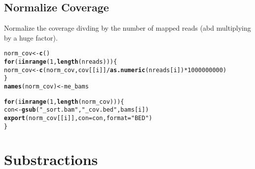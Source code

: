 \documentclass{article}\usepackage[]{graphicx}\usepackage[]{color}
\makeatletter
\newcommand{\hlnum}[1]{\textcolor[rgb]{0.686,0.059,0.569}{#1}}%
\newcommand{\hlstr}[1]{\textcolor[rgb]{0.192,0.494,0.8}{#1}}%
\newcommand{\hlopt}[1]{\textcolor[rgb]{0,0,0}{#1}}%
\newcommand{\hlstd}[1]{\textcolor[rgb]{0.345,0.345,0.345}{#1}}%
\newcommand{\hlkwa}[1]{\textcolor[rgb]{0.161,0.373,0.58}{\textbf{#1}}}%
\newcommand{\hlkwb}[1]{\textcolor[rgb]{0.69,0.353,0.396}{#1}}%
\newcommand{\hlkwc}[1]{\textcolor[rgb]{0.333,0.667,0.333}{#1}}%
\newcommand{\hlkwd}[1]{\textcolor[rgb]{0.737,0.353,0.396}{\textbf{#1}}}%
\newenvironment{kframe}{%
 \def\at@end@of@kframe{}%
 \ifinner\ifhmode%
  \def\at@end@of@kframe{\end{minipage}}%
  \begin{minipage}{\columnwidth}%
 \fi\fi%
 \def\FrameCommand##1{\hskip\@totalleftmargin \hskip-\fboxsep
 \colorbox{shadecolor}{##1}\hskip-\fboxsep
     \hskip-\linewidth \hskip-\@totalleftmargin \hskip\columnwidth}%
 \MakeFramed {\advance\hsize-\width
   \@totalleftmargin\z@ \linewidth\hsize
   \@setminipage}}%
 {\par\unskip\endMakeFramed%
 \at@end@of@kframe}
\newenvironment{knitrout}{}{} %
\makeatother
\begin{document}
\subsection{Normalize Coverage}
\noindent Normalize the coverage divding by the number of mapped reads (abd multiplying by a huge factor).
\begin{knitrout}
\color{fgcolor}\begin{kframe}
\begin{alltt}
\hlstd{norm_cov} \hlkwb{<-} \hlkwd{c}\hlstd{()}
\hlkwa{for} \hlstd{(i} \hlkwa{in} \hlkwd{range}\hlstd{(}\hlnum{1}\hlstd{,}\hlkwd{length}\hlstd{(nreads)))\{}
  \hlstd{norm_cov} \hlkwb{<-} \hlkwd{c}\hlstd{(norm_cov, cov[[i]]}\hlopt{/}\hlkwd{as.numeric}\hlstd{(nreads[i])}\hlopt{*}\hlnum{1000000000}\hlstd{)}
\hlstd{\}}
\hlkwd{names}\hlstd{(norm_cov)} \hlkwb{<-} \hlstd{me_bams}
\end{alltt}


{\ttfamily\noindent\bfseries\color{errorcolor}{\#\# Error in names(norm\_cov) <- me\_bams: 'names' attribute [5] must be the same length as the vector [2]}}\end{kframe}
\end{knitrout}


\begin{knitrout}
\color{fgcolor}\begin{kframe}
\begin{alltt}
\hlkwa{for} \hlstd{(i} \hlkwa{in} \hlkwd{range}\hlstd{(}\hlnum{1}\hlstd{,} \hlkwd{length}\hlstd{(norm_cov)))\{}
  \hlstd{con} \hlkwb{<-} \hlkwd{gsub}\hlstd{(}\hlstr{"_sort.bam"}\hlstd{,} \hlstr{"_cov.bed"}\hlstd{, bams[i])}
  \hlkwd{export}\hlstd{(norm_cov[[i]],} \hlkwc{con} \hlstd{= con,} \hlkwc{format} \hlstd{=} \hlstr{"BED"}\hlstd{)}
\hlstd{\}}
\end{alltt}
\end{kframe}
\end{knitrout}

\section{Substractions}%
\end{document}
